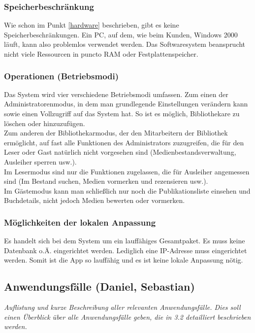 \documentclass[fontsize=12pt,paper=a4,twoside]{scrartcl}
\begin{document}
\subsubsection{Speicherbeschränkung}
Wie schon im Punkt \ref{hardware} beschrieben, gibt es keine Speicherbeschränkungen. Ein PC, auf dem, 
wie beim Kunden, Windows 2000 läuft, kann also problemlos verwendet werden. Das Softwaresystem 
beansprucht nicht viele Ressourcen in puncto RAM oder Festplattenspeicher.

\subsubsection{Operationen (Betriebsmodi)}
 Das System wird vier verschiedene Betriebsmodi umfassen. Zum einen der Administratorenmodus, in dem man grundlegende Einstellungen verändern kann sowie einen Vollzugriff auf das System hat. So ist es möglich, Bibliothekare zu löschen oder hinzuzufügen. \\
Zum anderen der Bibliothekarmodus, der den Mitarbeitern der Bibliothek ermöglicht, auf fast alle Funktionen des Administrators zuzugreifen, die für den Leser oder Gast natürlich nicht vorgesehen sind (Medienbestandsverwaltung, Ausleiher sperren usw.).\\
Im Lesermodus sind nur die Funktionen zugelassen, die für Ausleiher angemessen sind (Im Bestand suchen, Medien vormerken und rezensieren usw.). \\
Im Gästemodus kann man schließlich nur noch die Publikationsliste einsehen und Buchdetails, nicht jedoch Medien bewerten oder vormerken.

\subsubsection{Möglichkeiten der lokalen Anpassung}
 Es handelt sich bei dem System um ein lauffähiges Gesamtpaket. Es muss keine Datenbank o.Ä. eingerichtet werden. Lediglich eine IP-Adresse muss eingerichtet werden. Somit ist die App so lauffähig und es ist keine lokale Anpassung nötig.


\subsection{Anwendungsfälle (Daniel, Sebastian)}
  {\em Auflistung und kurze Beschreibung aller relevanten
  Anwendungsfälle. Dies soll einen Überblick über alle Anwendungsfälle
  geben, die in 3.2 detailliert beschrieben werden.}
  
\end{document}

